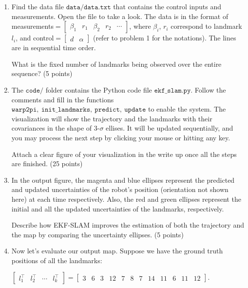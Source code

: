 \documentclass[12pt, a4paper]{article}
\begin{document}
\begin{enumerate}
	\item Find the data file $\mathtt{data/data.txt}$ that contains the
	      control inputs and measurements. Open the file to take a look. The
	      data is in the format of measurements$=\left[\begin{array}{ccccc}
				      \beta_{1} & r_{1} & \beta_{2} & r_{2} & \cdots\end{array}\right]$, where $\beta_{i}$, $r_{i}$ correspond to landmark $l_{i}$, and control$=\left[\begin{array}{cc}
				      d & \alpha\end{array}\right]$ (refer to problem 1 for the notations). The
	      lines are in sequential time order.

	      What is the fixed number
	      of landmarks being observed over the entire sequence? (5 points)

	\item The $\mathtt{code/}$ folder contains the Python code file
	      $\mathtt{ekf\_slam.py}$. Follow the comments and fill in the functions $\mathtt{warp2pi},~\mathtt{init\_landmarks}, ~\mathtt{predict}, ~\mathtt{update}$ to enable the system. The visualization will show the trajectory and the landmarks with their covariances in the shape of 3-$\sigma$ ellises. It will be updated sequentially, and you may process the next step by clicking your mouse or hitting any key.

	      Attach a clear figure of your
	      visualization in the write up once all the steps are finished. (25 points)

	\item In the output figure, the magenta and blue ellipses represent
	      the predicted and updated uncertainties of the robot's position (orientation
	      not shown here) at each time respectively. Also, the red and green
	      ellipses represent the initial and all the updated uncertainties of
	      the landmarks, respectively.

	      Describe how EKF-SLAM improves the estimation
	      of both the trajectory and the map by comparing the uncertainty ellipses.
	      (5 points)

	\item Now let's evaluate our output map. Suppose we have the ground
	      truth positions of all the landmarks:

	      $\left[\begin{array}{cccc}
				      l_{1}^{\top} & l_{2}^{\top} & \cdots & l_{k}^{\top}\end{array}\right]=\left[\begin{array}{cccccccccccc}
				      3 & 6 & 3 & 12 & 7 & 8 & 7 & 14 & 11 & 6 & 11 & 12\end{array}\right]$.


\end{enumerate}
\end{document}
